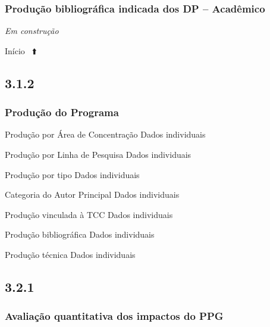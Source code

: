 \documentclass[
  a4paper,
]{book}
\begin{document}
\hypertarget{produuxe7uxe3o-bibliogruxe1fica-indicada-dos-dp-acaduxeamico}{%
\subsubsection{\texorpdfstring{\textbf{Produção bibliográfica indicada dos DP -- Acadêmico}}{Produção bibliográfica indicada dos DP -- Acadêmico}}\label{produuxe7uxe3o-bibliogruxe1fica-indicada-dos-dp-acaduxeamico}}

\emph{Em construção}

Início ~⬆️

\hypertarget{section-24}{%
\subsection{\texorpdfstring{\textbf{3.1.2}}{3.1.2}}\label{section-24}}

\hypertarget{produuxe7uxe3o-do-programa}{%
\subsubsection{\texorpdfstring{\textbf{Produção do Programa}}{Produção do Programa}}\label{produuxe7uxe3o-do-programa}}

Produção por Área de Concentração \textbar{} Dados individuais

Produção por Linha de Pesquisa \textbar{} Dados individuais

Produção por tipo \textbar{} Dados individuais

Categoria do Autor Principal \textbar{} Dados individuais

Produção vinculada à TCC \textbar{} Dados individuais

Produção bibliográfica \textbar{} Dados individuais

Produção técnica \textbar{} Dados individuais

\hypertarget{section-25}{%
\subsection{\texorpdfstring{\textbf{3.2.1}}{3.2.1}}\label{section-25}}

\hypertarget{avaliauxe7uxe3o-quantitativa-dos-impactos-do-ppg}{%
\subsubsection{\texorpdfstring{\textbf{Avaliação quantitativa dos impactos do PPG}}{Avaliação quantitativa dos impactos do PPG}}\label{avaliauxe7uxe3o-quantitativa-dos-impactos-do-ppg}}
\end{document}
